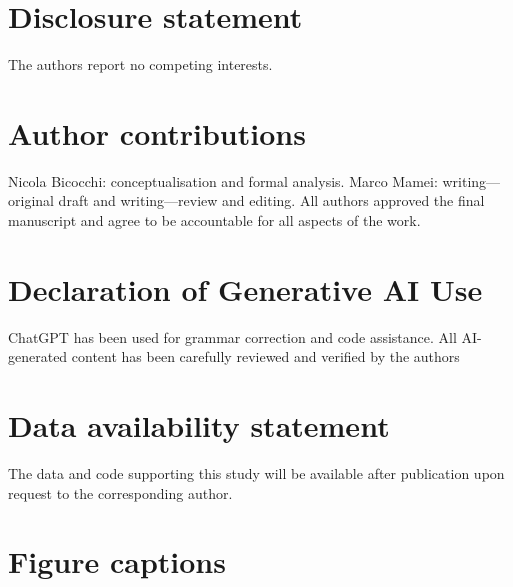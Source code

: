 \documentclass{interact}
\newcommand{\FigureCaptions}{}
\begin{document}
\section*{Disclosure statement}
The authors report no competing interests.

\section*{Author contributions}
Nicola Bicocchi: conceptualisation and formal analysis. Marco Mamei: writing---original draft and writing---review and editing. All authors approved the final manuscript and agree to be accountable for all aspects of the work.

\section*{Declaration of Generative AI Use}
ChatGPT has been used for grammar correction and code assistance.
All AI-generated content has been carefully reviewed and verified by the authors

\section*{Data availability statement}
The data and code supporting this study will be available after publication upon request to the corresponding author.



\processdelayedfloats
\clearpage
\section*{Figure captions}
\begin{description}
  \FigureCaptions
\end{description}
\end{document}
